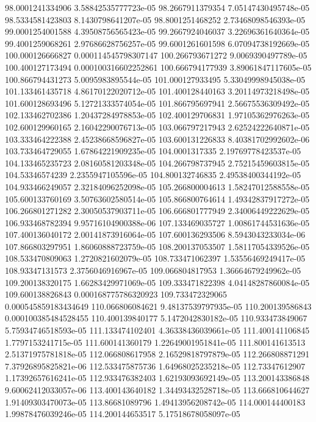 {98.0001241334906 3.58842535777723e-05
98.2667911379354 7.05147430495748e-05
98.5334581423803 8.1430798641207e-05
98.8001251468252 2.73468098546393e-05
99.0001254001588 4.39508756565423e-05
99.2667924046037 3.22696361640364e-05
99.4001259068261 2.97686628756257e-05
99.6001261601598 6.07094738192669e-05
100.000126666827 0.000114545798307147
100.266793671272 9.0069390497789e-05
100.400127173494 0.000100316602252861
100.666794177939 3.89061847117605e-05
100.866794431273 5.0095983895544e-05
101.000127933495 5.33049998945038e-05
101.133461435718 4.86170122020712e-05
101.400128440163 3.20114973218498e-05
101.600128693496 5.12721333574054e-05
101.866795697941 2.56675536309492e-05
102.133462702386 1.20437284978853e-05
102.400129706831 1.97105362976263e-05
102.600129960165 2.16042290076713e-05
103.066797217943 2.62524222640871e-05
103.333464222388 2.45238668596827e-05
103.600131226833 8.40381702992602e-06
103.733464729055 1.67864221909235e-05
104.0001317335 2.19769778423537e-05
104.133465235723 2.08160581203348e-05
104.266798737945 2.75215459603815e-05
104.53346574239 2.2355947105596e-05
104.800132746835 2.49538400344192e-05
104.933466249057 2.32184096252098e-05
105.266800004613 1.58247012588558e-05
105.600133760169 3.50763602580514e-05
105.866800764614 1.49342837917272e-05
106.266801271282 2.30050537903711e-05
106.666801777949 2.34006449222629e-05
106.933468782394 9.95716104900388e-06
107.133469035727 1.00861744531636e-05
107.400136040172 2.00141873916064e-05
107.600136293506 8.5943043233034e-06
107.866803297951 1.86060888723759e-05
108.200137053507 1.58117054339526e-05
108.533470809063 1.2720821602079e-05
108.733471062397 1.53556469249417e-05
108.93347131573 2.3756046916967e-05
109.066804817953 1.36664679249962e-05
109.200138320175 1.66283429971069e-05
109.333471822398 4.04148287860084e-05
109.600138826843 0.000168775786320923
109.733472329065 0.000545859183434649
110.066806084621 9.48137539797935e-05
110.200139586843 0.000100385484528455
110.400139840177 5.1472042830182e-05
110.933473849067 5.75934746518593e-05
111.133474102401 4.36338436039661e-05
111.400141106845 1.7797153241715e-05
111.600141360179 1.22649001951841e-05
111.800141613513 2.51371975781818e-05
112.066808617958 2.16529818797879e-05
112.266808871291 7.37926895825821e-06
112.533475875736 1.64968025235218e-05
112.73347612907 1.17392657616241e-05
112.933476382403 1.62193093692149e-05
113.200143386848 9.60062412033057e-06
113.400143640182 1.34493432528718e-05
113.666810644627 1.91409303470073e-05
113.86681089796 1.49413956208742e-05
114.000144400183 1.99878476039246e-05
114.200144653517 5.17518678058097e-05
}
